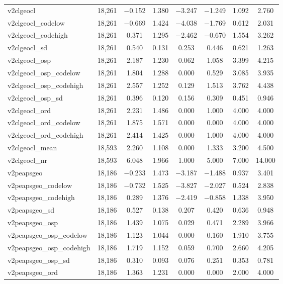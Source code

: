 \begin{table}[!htbp]
\begin{tabular}{@{\extracolsep{5pt}}lccccccc}
v2clgeocl & 18,261 & $-$0.152 & 1.380 & $-$3.247 & $-$1.249 & 1.092 & 2.760 \\ 
v2clgeocl\_codelow & 18,261 & $-$0.669 & 1.424 & $-$4.038 & $-$1.769 & 0.612 & 2.031 \\ 
v2clgeocl\_codehigh & 18,261 & 0.371 & 1.295 & $-$2.462 & $-$0.670 & 1.554 & 3.262 \\ 
v2clgeocl\_sd & 18,261 & 0.540 & 0.131 & 0.253 & 0.446 & 0.621 & 1.263 \\ 
v2clgeocl\_osp & 18,261 & 2.187 & 1.230 & 0.062 & 1.058 & 3.399 & 4.215 \\ 
v2clgeocl\_osp\_codelow & 18,261 & 1.804 & 1.288 & 0.000 & 0.529 & 3.085 & 3.935 \\ 
v2clgeocl\_osp\_codehigh & 18,261 & 2.557 & 1.252 & 0.129 & 1.513 & 3.762 & 4.438 \\ 
v2clgeocl\_osp\_sd & 18,261 & 0.396 & 0.120 & 0.156 & 0.309 & 0.451 & 0.946 \\ 
v2clgeocl\_ord & 18,261 & 2.231 & 1.486 & 0.000 & 1.000 & 4.000 & 4.000 \\ 
v2clgeocl\_ord\_codelow & 18,261 & 1.875 & 1.571 & 0.000 & 0.000 & 4.000 & 4.000 \\ 
v2clgeocl\_ord\_codehigh & 18,261 & 2.414 & 1.425 & 0.000 & 1.000 & 4.000 & 4.000 \\ 
v2clgeocl\_mean & 18,593 & 2.260 & 1.108 & 0.000 & 1.333 & 3.200 & 4.500 \\ 
v2clgeocl\_nr & 18,593 & 6.048 & 1.966 & 1.000 & 5.000 & 7.000 & 14.000 \\ 
v2peapsgeo & 18,186 & $-$0.233 & 1.473 & $-$3.187 & $-$1.488 & 0.937 & 3.401 \\ 
v2peapsgeo\_codelow & 18,186 & $-$0.732 & 1.525 & $-$3.827 & $-$2.027 & 0.524 & 2.838 \\ 
v2peapsgeo\_codehigh & 18,186 & 0.289 & 1.376 & $-$2.419 & $-$0.858 & 1.338 & 3.950 \\ 
v2peapsgeo\_sd & 18,186 & 0.527 & 0.138 & 0.207 & 0.420 & 0.636 & 0.948 \\ 
v2peapsgeo\_osp & 18,186 & 1.439 & 1.075 & 0.029 & 0.471 & 2.289 & 3.966 \\ 
v2peapsgeo\_osp\_codelow & 18,186 & 1.123 & 1.044 & 0.000 & 0.160 & 1.910 & 3.755 \\ 
v2peapsgeo\_osp\_codehigh & 18,186 & 1.719 & 1.152 & 0.059 & 0.700 & 2.660 & 4.205 \\ 
v2peapsgeo\_osp\_sd & 18,186 & 0.310 & 0.093 & 0.076 & 0.251 & 0.353 & 0.781 \\ 
v2peapsgeo\_ord & 18,186 & 1.363 & 1.231 & 0.000 & 0.000 & 2.000 & 4.000 \\ 

\end{tabular}
\end{table}
